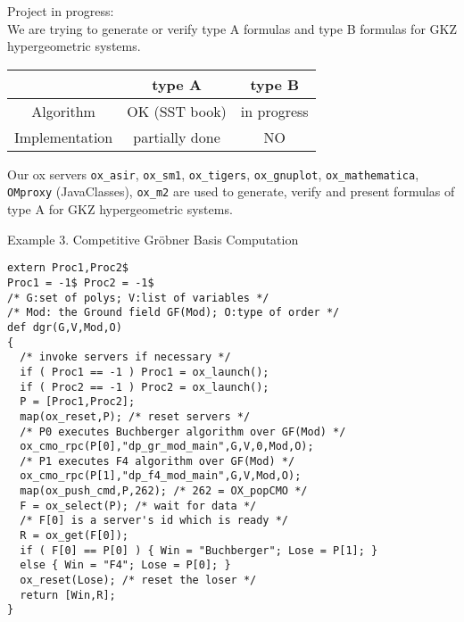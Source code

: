\documentclass{slides}
\begin{document}
\noindent
Project in progress: \\
We are trying to generate or verify type A formulas and type B formulas
for {\color{blue} GKZ hypergeometric systems}.

\begin{tabular}{|c|c|c|}
\hline
  & type A & type B \\ \hline
Algorithm &  {\color{red} OK} (SST book) &  in progress \\ \hline
Implementation & partially done & NO \\ \hline
\end{tabular}

\noindent
Our ox servers
{\tt ox\_asir}, {\tt ox\_sm1}, {\tt ox\_tigers}, {\tt ox\_gnuplot},
{\tt ox\_mathematica}, {\tt OMproxy} (JavaClasses), {\tt ox\_m2}
are used to generate, verify and present formulas of type A
for GKZ hypergeometric systems.

\newpage
\noindent
{\color{green} Example 3. Competitive Gr\"obner Basis Computation}
\begin{verbatim}
extern Proc1,Proc2$
Proc1 = -1$ Proc2 = -1$
/* G:set of polys; V:list of variables */
/* Mod: the Ground field GF(Mod); O:type of order */
def dgr(G,V,Mod,O)
{
  /* invoke servers if necessary */
  if ( Proc1 == -1 ) Proc1 = ox_launch();
  if ( Proc2 == -1 ) Proc2 = ox_launch();
  P = [Proc1,Proc2];
  map(ox_reset,P); /* reset servers */
  /* P0 executes Buchberger algorithm over GF(Mod) */
  ox_cmo_rpc(P[0],"dp_gr_mod_main",G,V,0,Mod,O);
  /* P1 executes F4 algorithm over GF(Mod) */
  ox_cmo_rpc(P[1],"dp_f4_mod_main",G,V,Mod,O);
  map(ox_push_cmd,P,262); /* 262 = OX_popCMO */
  F = ox_select(P); /* wait for data */
  /* F[0] is a server's id which is ready */
  R = ox_get(F[0]);
  if ( F[0] == P[0] ) { Win = "Buchberger"; Lose = P[1]; }
  else { Win = "F4"; Lose = P[0]; }
  ox_reset(Lose); /* reset the loser */
  return [Win,R];
}
\end{verbatim}
\newpage
\end{document}
